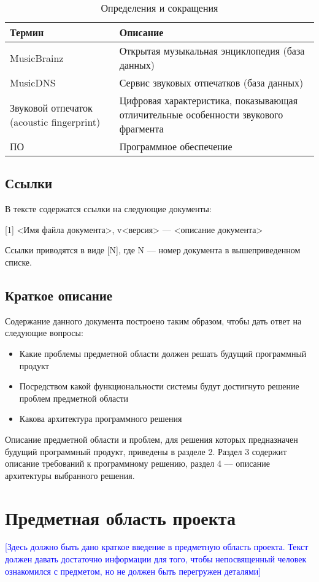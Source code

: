 \documentclass[pdftex,12pt,a4paper]{report}
\providecommand{\comment}[1]{\textcolor{blue}{#1}}
\begin{document}
\begin{table}[h]  %
\caption{Определения и сокращения}
\begin{tabular}{|p{4cm}|p{10cm}|} \hline
Термин & Описание \\ \hline
MusicBrainz & Открытая музыкальная энциклопедия (база данных) \\ \hline
MusicDNS    & Сервис звуковых отпечатков (база данных) \\ \hline
Звуковой отпечаток (acoustic fingerprint) & Цифровая характеристика, показывающая отличительные особенности звукового фрагмента \\ \hline
ПО & Программное обеспечение \\ \hline
\end{tabular}
\end{table}

\subsection{Ссылки}
В тексте содержатся ссылки на следующие документы:

[1]	<Имя файла документа>, v<версия> --- <описание документа>

Ссылки приводятся в виде [N], где N --- номер документа в вышеприведенном списке.

\subsection{Краткое описание}
Содержание данного документа построено таким образом, чтобы дать ответ на следующие вопросы:

\begin{itemize}
	\item Какие проблемы предметной области должен решать будущий программный продукт
	\item Посредством какой функциональности системы будут достигнуто решение проблем предметной области
	\item Какова архитектура программного решения
\end{itemize}

Описание предметной области и проблем, для решения которых предназначен будущий программный продукт, приведены в разделе 2.
Раздел 3 содержит описание требований к программному решению, раздел 4 –-- описание архитектуры выбранного решения.

\section{Предметная область проекта}
\comment{[Здесь должно быть дано краткое введение в предметную область проекта. Текст должен давать достаточно информации для того, чтобы непосвященный человек ознакомился с предметом, но не должен быть перегружен деталями]}
\end{document}
